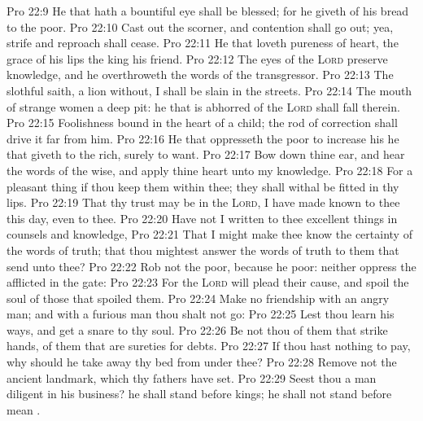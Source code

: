 \vs Pro 22:9 He that hath a bountiful eye shall be blessed; for he giveth of his bread to the poor.
\vs Pro 22:10 Cast out the scorner, and contention shall go out; yea, strife and reproach shall cease.
\vs Pro 22:11 He that loveth pureness of heart,  the grace of his lips the king  his friend.
\vs Pro 22:12 The eyes of the \textsc{Lord} preserve knowledge, and he overthroweth the words of the transgressor.
\vs Pro 22:13 The slothful  saith,  a lion without, I shall be slain in the streets.
\vs Pro 22:14 The mouth of strange women  a deep pit: he that is abhorred of the \textsc{Lord} shall fall therein.
\vs Pro 22:15 Foolishness  bound in the heart of a child;  the rod of correction shall drive it far from him.
\vs Pro 22:16 He that oppresseth the poor to increase his  he that giveth to the rich,  surely  to want.
\vs Pro 22:17 Bow down thine ear, and hear the words of the wise, and apply thine heart unto my knowledge.
\vs Pro 22:18 For  a pleasant thing if thou keep them within thee; they shall withal be fitted in thy lips.
\vs Pro 22:19 That thy trust may be in the \textsc{Lord}, I have made known to thee this day, even to thee.
\vs Pro 22:20 Have not I written to thee excellent things in counsels and knowledge,
\vs Pro 22:21 That I might make thee know the certainty of the words of truth; that thou mightest answer the words of truth to them that send unto thee?
\vs Pro 22:22 Rob not the poor, because he  poor: neither oppress the afflicted in the gate:
\vs Pro 22:23 For the \textsc{Lord} will plead their cause, and spoil the soul of those that spoiled them.
\vs Pro 22:24 Make no friendship with an angry man; and with a furious man thou shalt not go:
\vs Pro 22:25 Lest thou learn his ways, and get a snare to thy soul.
\vs Pro 22:26 Be not thou  of them that strike hands,  of them that are sureties for debts.
\vs Pro 22:27 If thou hast nothing to pay, why should he take away thy bed from under thee?
\vs Pro 22:28 Remove not the ancient landmark, which thy fathers have set.
\vs Pro 22:29 Seest thou a man diligent in his business? he shall stand before kings; he shall not stand before mean .
